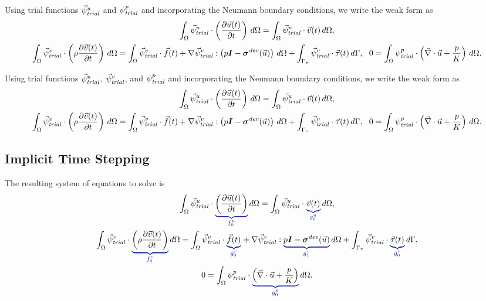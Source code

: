 Using trial functions $\trialvec[u]$ and $\trialscalar[p]$ and
incorporating the Neumann boundary conditions, we write the weak form
as
\begin{gather}
  \int_\Omega \trialvec[u] \cdot \left( \frac{\partial \vec{u}(t)}{\partial t} \right) \, 
d\Omega = 
  \int_\Omega \trialvec[u] \cdot \vec{v}(t) \, d\Omega, \\
  \int_\Omega \trialvec[v] \cdot \left( \rho \frac{\partial \vec{v}(t)}{\partial t} \right) \, 
d\Omega = 
  \int_\Omega \trialvec[v] \cdot \vec{f}(t) + \nabla \trialvec[v] : \left(p\tensor{I}-
\tensor{\sigma}^\mathit{dev}
(\vec{u})\right)\, d\Omega + \int_{\Gamma_\tau} \trialvec[v] \cdot \vec{\tau}(t) \, d\Gamma, \
\
  0 = \int_\Omega \trialscalar[p] \cdot \left(\vec{\nabla} \cdot \vec{u} + \frac{p}{K} \right) 
\, d\Omega.
\end{gather}

Using trial functions $\trialvec[u]$, $\trialvec[v]$, and $\trialscalar[p]$ and
incorporating the Neumann boundary conditions, we write the weak form
as
\begin{gather}
  \int_\Omega \trialvec[u] \cdot \left( \frac{\partial \vec{u}(t)}{\partial t} \right) \, 
d\Omega = 
  \int_\Omega \trialvec[u] \cdot \vec{v}(t) \, d\Omega, \\
  \int_\Omega \trialvec[v] \cdot \left( \rho \frac{\partial \vec{v}(t)}{\partial t} \right) \, 
d\Omega = 
  \int_\Omega \trialvec[v] \cdot \vec{f}(t) + \nabla \trialvec[v] : \left(p\tensor{I}-
\tensor{\sigma}^\mathit{dev}
(\vec{u})\right)\, d\Omega + \int_{\Gamma_\tau} \trialvec[v] \cdot \vec{\tau}(t) \, d\Gamma, \
\
  0 = \int_\Omega \trialscalar[p] \cdot \left(\vec{\nabla} \cdot \vec{u} + \frac{p}{K} \right) 
\, d\Omega.
\end{gather}

\subsection{Implicit Time Stepping}
The resulting system of equations to solve  is
\begin{gather}
  \label{eqn:incompressible:elasticity:velocity}
  \int_\Omega \trialvec[u] \cdot \eqnannotate{\left( \frac{\partial \vec{u}(t)}{\partial t} 
\right)}{f_0^u} \, 
d\Omega = 
  \int_\Omega \trialvec[u] \cdot \eqnannotate{\vec{v}(t)}{g_0^u} \, d\Omega, \\
%
  \label{eqn:incompressible:elasticity:displacement:implicit}
  \int_\Omega \trialvec[v] \cdot \eqnannotate{\left( \rho \frac{\partial \vec{v}(t)}{\partial 
t} \right)}{f_0^v} 
\, d\Omega =
  \int_\Omega \trialvec[v] \cdot \eqnannotate{\vec{f}(t)}{g_0^v} + \nabla \trialvec[v] : 
\eqnannotate{p\tensor{I}-
\tensor{\sigma}^\mathit{dev}(\vec{u})}{g_1^v} \, d\Omega + \int_{\Gamma_\tau} \trialvec[v] 
\cdot 
\eqnannotate{\vec{\tau}(t)}{g_0^v} \, d\Gamma, \\
%
  \label{eqn:incompressible:elasticity:pressure:implicit}
  0 = \int_\Omega \trialscalar[p] \cdot \eqnannotate{\left(\vec{\nabla} \cdot \vec{u} + 
\frac{p}{K} \right)}
{g_0^p} \, d\Omega.
\end{gather}



